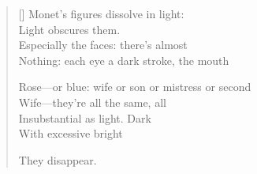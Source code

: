 \label{ch:print_over_the_sink}
\settowidth{\versewidth}{Rose—or blue: wife or son or mistress or second}
\begin{verse}[\versewidth]
Monet's figures dissolve in light:\\
Light obscures them.\\
Especially the faces: there's almost\\
Nothing: each eye a dark stroke, the mouth

Rose---or blue: wife or son or mistress or second\\
Wife---they're all the same, all\\
Insubstantial as light.    Dark\\
With excessive bright

They disappear.
\end{verse}
